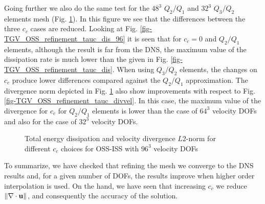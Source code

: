 Going further we also do the same test for the $48^3$ $Q_2/Q_1$ and $32^3$ $Q_3/Q_2$ elements mesh (Fig. \ref{fig-TGV_OSS_refinement_tauc_divvel_96}). In this figure we see that the differences between the three $c_c$ cases are reduced. Looking at Fig. \ref{fig-TGV_OSS_refinement_tauc_dis_96} it is seen that for $c_c=0$ and $Q_2/Q_1$ elements, although the result is far from the DNS, the maximum value of the dissipation rate is much lower than the given in Fig. \ref{fig-TGV_OSS_refinement_tauc_dis}. When using $Q_3/Q_2$ elements, the changes on $c_c$ produce lower differences compared against the $Q_2/Q_1$ approximation. The divergence norm depicted in Fig. \ref{fig-TGV_OSS_refinement_tauc_divvel_96} also show improvements with respect to Fig. \ref{fig-TGV_OSS_refinement_tauc_divvel}. In this case, the maximum value of the divergence for $c_c$ for $Q_2/Q_1$ elements is lower than the case of $64^3$ velocity DOFs and also for the case of $32^3$ velocity DOFs.
\begin{figure}[h!]
  \centering
  \caption{Total energy dissipation and velocity divergence $L2$-norm for different $c_c$ choices for OSS-ISS with $96^3$ velocity DOFs}
  \label{fig-TGV_OSS_refinement_tauc_divvel_96}
\end{figure}

To summarize, we have checked that refining the mesh we converge to the DNS results and, for a given number of DOFs, the results improve when higher order interpolation is used. On the hand, we have seen that increasing $c_c$ we reduce $\|\nabla\cdot{\bf u}\|$, and consequently the accuracy of the solution. %

